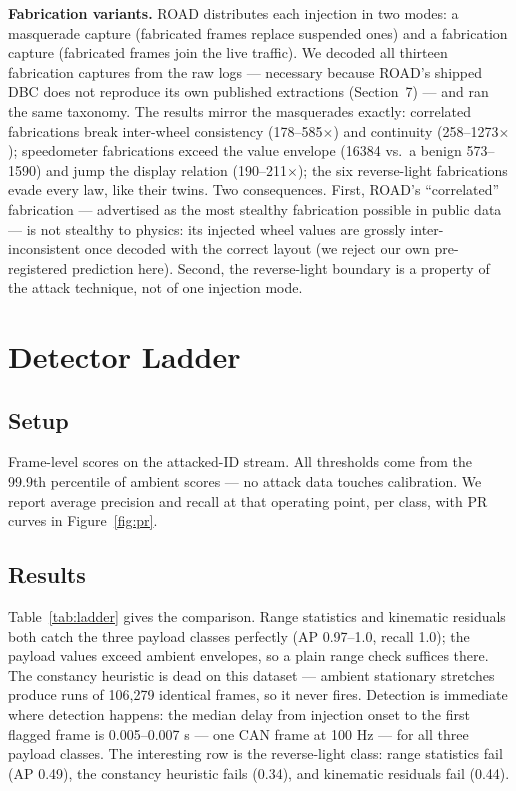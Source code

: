 \documentclass[10pt,twocolumn]{article}
\begin{document}
\textbf{Fabrication variants.} ROAD distributes each injection in two modes: a masquerade capture (fabricated frames replace suspended ones) and a fabrication capture (fabricated frames join the live traffic). We decoded all thirteen fabrication captures from the raw logs --- necessary because ROAD's shipped DBC does not reproduce its own published extractions (Section~7) --- and ran the same taxonomy. The results mirror the masquerades exactly: correlated fabrications break inter-wheel consistency (178--585$\times$) and continuity (258--1273$\times$); speedometer fabrications exceed the value envelope (16384 vs.\ a benign 573--1590) and jump the display relation (190--211$\times$); the six reverse-light fabrications evade every law, like their twins. Two consequences. First, ROAD's ``correlated'' fabrication --- advertised as the most stealthy fabrication possible in public data --- is not stealthy to physics: its injected wheel values are grossly inter-inconsistent once decoded with the correct layout (we reject our own pre-registered prediction here). Second, the reverse-light boundary is a property of the attack technique, not of one injection mode.

\section{Detector Ladder}
\subsection{Setup}
Frame-level scores on the attacked-ID stream. All thresholds come from the 99.9th percentile of ambient scores --- no attack data touches calibration. We report average precision and recall at that operating point, per class, with PR curves in Figure~\ref{fig:pr}.

\subsection{Results}
Table~\ref{tab:ladder} gives the comparison. Range statistics and kinematic residuals both catch the three payload classes perfectly (AP 0.97--1.0, recall 1.0); the payload values exceed ambient envelopes, so a plain range check suffices there. The constancy heuristic is dead on this dataset --- ambient stationary stretches produce runs of 106{,}279 identical frames, so it never fires. Detection is immediate where detection happens: the median delay from injection onset to the first flagged frame is 0.005--0.007 s --- one CAN frame at 100 Hz --- for all three payload classes. The interesting row is the reverse-light class: range statistics fail (AP 0.49), the constancy heuristic fails (0.34), and kinematic residuals fail (0.44).
\end{document}
